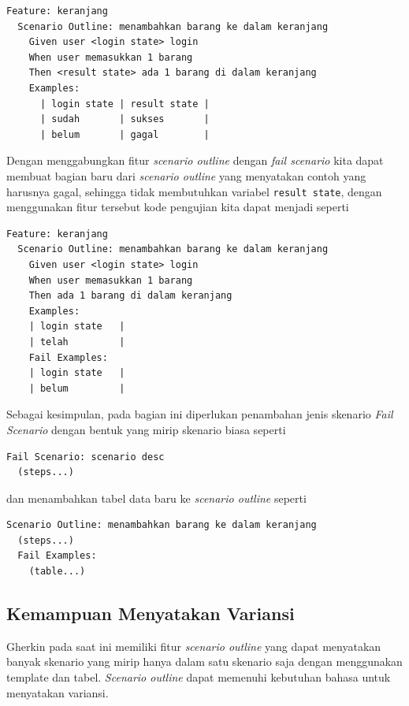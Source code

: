 \begin{lstlisting}[language=gherkin]
Feature: keranjang
  Scenario Outline: menambahkan barang ke dalam keranjang
    Given user <login state> login
    When user memasukkan 1 barang
    Then <result state> ada 1 barang di dalam keranjang
    Examples:
      | login state | result state |
      | sudah       | sukses       |
      | belum       | gagal        |
\end{lstlisting}

Dengan menggabungkan fitur \emph{scenario outline} dengan \emph{fail scenario}
kita dapat membuat bagian baru dari \emph{scenario outline} yang menyatakan contoh
yang harusnya gagal, sehingga tidak membutuhkan variabel \texttt{result state},
dengan menggunakan fitur tersebut kode pengujian kita dapat menjadi seperti

\begin{lstlisting}[language=gherkin]
Feature: keranjang
  Scenario Outline: menambahkan barang ke dalam keranjang
    Given user <login state> login
    When user memasukkan 1 barang
    Then ada 1 barang di dalam keranjang
    Examples:
    | login state   |
    | telah         |
    Fail Examples:
    | login state   |
    | belum         |
\end{lstlisting}

Sebagai kesimpulan, pada bagian ini diperlukan penambahan jenis skenario \emph{Fail Scenario}
dengan bentuk yang mirip skenario biasa seperti

\begin{lstlisting}[language=gherkin]
Fail Scenario: scenario desc
  (steps...)
\end{lstlisting}

dan menambahkan tabel data baru ke \emph{scenario outline} seperti

\begin{lstlisting}[language=gherkin]
Scenario Outline: menambahkan barang ke dalam keranjang
  (steps...)
  Fail Examples:
    (table...)
\end{lstlisting}



\subsection{Kemampuan Menyatakan Variansi}

Gherkin pada saat ini memiliki fitur \emph{scenario outline} yang dapat menyatakan banyak skenario yang mirip
hanya dalam satu skenario saja dengan menggunakan template dan tabel.
\emph{Scenario outline} dapat memenuhi kebutuhan bahasa untuk menyatakan variansi.

